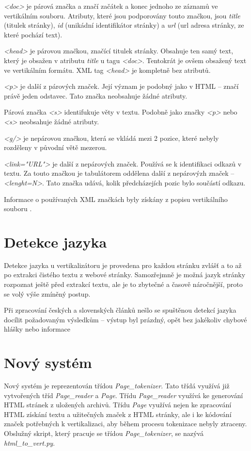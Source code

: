 \textit{<doc>} je párová značka a značí začátek a konec jednoho ze záznamů ve vertikálním souboru.
Atributy, které jsou podporovány touto značkou, jsou \textit{title} (titulek stránky),
\textit{id} (unikádní identifikátor stránky) a \textit{url} (url adresa stránky, ze které pochází text).

\textit{<head>} je párovou značkou, značící titulek stránky. Obsahuje ten samý text, který je obsažen v atributu
\textit{title} u tagu \textit{<doc>}. Tentokrát je ovšem obsažený text ve vertikálním formátu. XML tag
\textit{<head>} je kompletně bez atributů.

\textit{<p>} je další z párových značek. Její význam je podobný jako v HTML -- značí právě jeden odstavec.
Tato značka neobsahuje žádné atributy.

Párová značka \textit{<s>} identifukuje věty v textu. Podobně jako značky \textit{<p>} nebo \textit{<s>}
neobsahuje žádné atributy.

\textit{<g/>} je nepárovou značkou, která se vkládá mezi 2 pozice, které nebyly rozděleny v původní větě
mezerou.

\textit{<link="URL"\textgreater} je další z nepárových značek. Používá se k identifikaci odkazů v textu. Za touto
značkou je tabulátorem oddělena další z nepárovýzh značek -- \textit{<lenght=N>}. Tato značka
udává, kolik předcházejích pozic bylo součástí odkazu.

Informace o používaných XML značkách byly získány z popisu vertikálního souboru \cite{VERTIKAL}.

\section{Detekce jazyka}
Detekce jazyka u vertikalizátoru je provedena pro každou stránku zvlášť a to až po extrakci čistého textu z webové stránky.
Samozřejmně je možná jazyk stránky rozpoznat ještě před extrakcí textu, ale je to zbytečné a časově náročnější,
proto se volý výše zmíněný postup.

Při zpracování českých a slovenských článků nešlo se spuštěnou detekcí jazyka docílit požadovaným výsledkům -- výstup
byl prázdný, opět bez jakékoliv chybové hlášky nebo informace

\section{Nový systém}
Nový systém je reprezentován třídou \textit{Page\_tokenizer}. Tato třídá využívá již vytvořených tříd
\textit{Page\_reader} a \textit{Page}. Třídu \textit{Page\_reader} využívá ke generování HTML stránek
z uložených archivů. Třídu \textit{Page} využívá nejen ke zpracování HTML získání textu a užitečných značek
z HTML stránky, ale i ke kódování značek potřebných k vertikalizaci, aby během procesu tokenizace nebyly
ztraceny. Obslužný skript, který pracuje se třídou \textit{Page\_tokenizer}, se nazývá \textit{html\_to\_vert.py}.

